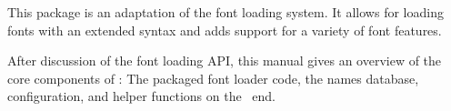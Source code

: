 
\beginfrontmatter


  \typesetdocumenttitle

  \beginabstractcontent
    This package is an adaptation of the \CONTEXT font loading system.
    It allows for loading \OpenType fonts with an extended syntax and adds
    support for a variety of font features.

    After discussion of the font loading API, this manual gives an
    overview of the core components of : The
    packaged font loader code, the names database, configuration, and
    helper functions on the \LUA\ end.
  \endabstractcontent

\endfrontmatter

\typesetcontent

